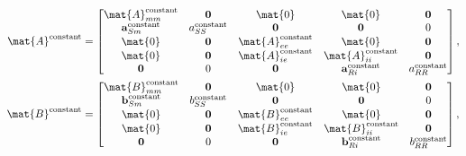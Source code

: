 \documentclass{jpmarticle}
\renewcommand{\vec}[1]{\boldsymbol{\mathrm{#1}}}
\begin{document}
\begin{equation}
  \begin{split}
    \mat{A}^{\text{constant}} &=
    \begin{bmatrix}
      \mat{A}_{mm}^{\text{constant}} & \vec{0} & \mat{0} & \mat{0} & \vec{0}
      \\
      \vec{a}_{Sm}^{\text{constant}} & a_{SS}^{\text{constant}} &
      \vec{0} & \vec{0} & 0
      \\
      \mat{0} & \vec{0} & \mat{A}_{ee}^{\text{constant}} & \mat{0} & \vec{0}
      \\
      \mat{0} & \vec{0} & \mat{A}_{ie}^{\text{constant}} &
      \mat{A}_{ii}^{\text{constant}} & \vec{0}
      \\
      \vec{0} & 0 & \vec{0} & \vec{a}_{Ri}^{\text{constant}} &
      a_{RR}^{\text{constant}}
    \end{bmatrix},
    \\
    \mat{B}^{\text{constant}} &=
    \begin{bmatrix}
      \mat{B}_{mm}^{\text{constant}} & \vec{0} & \mat{0} & \mat{0} & \vec{0}
      \\
      \vec{b}_{Sm}^{\text{constant}} & b_{SS}^{\text{constant}} &
      \vec{0} & \vec{0} & 0
      \\
      \mat{0} & \vec{0} & \mat{B}_{ee}^{\text{constant}} & \mat{0} & \vec{0}
      \\
      \mat{0} & \vec{0} & \mat{B}_{ie}^{\text{constant}} &
      \mat{B}_{ii}^{\text{constant}} & \vec{0}
      \\
      \vec{0} & 0 & \vec{0} & \vec{b}_{Ri}^{\text{constant}} &
      b_{RR}^{\text{constant}}
    \end{bmatrix},
  \end{split}
\end{equation}
\end{document}
